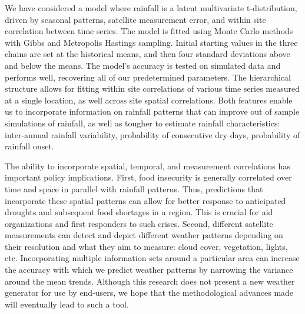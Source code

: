 \documentclass[12pt]{article}
\begin{document}
We have considered a model where rainfall is a latent multivariate t-distribution, driven by seasonal patterns, satellite measurement error, and within site correlation between time series. The model is fitted using Monte Carlo methods with Gibbs and Metropolis Hastings sampling. Initial starting values in the three chains are set at the historical means, and then four standard deviations above and below the means. The model's accuracy is tested on simulated data and performs well, recovering all of our predetermined parameters. The hierarchical structure allows for fitting within site correlations of various time series measured at a single location, as well across site spatial correlations. Both features enable us to incorporate information on rainfall patterns that can improve out of sample simulations of rainfall, as well as tougher to estimate rainfall characteristics: inter-annual rainfall variability, probability of consecutive dry days, probability of rainfall onset.

The ability to incorporate spatial, temporal, and measurement correlations has important policy implications. First, food insecurity is generally correlated over time and space in parallel with rainfall patterns. Thus, predictions that incorporate these spatial patterns can allow for better response to anticipated droughts and subsequent food shortages in a region. This is crucial for aid organizations and first responders to such crises. Second, different satellite measurements can detect and depict different weather patterns depending on their resolution and what they aim to measure: cloud cover, vegetation, lights, etc. Incorporating multiple information sets around a particular area can increase the accuracy with which we predict weather patterns by narrowing the variance around the mean trends. Although this research does not present a new weather generator for use by end-users, we hope that the methodological advances made will eventually lead to such a tool. 


\end{document}

